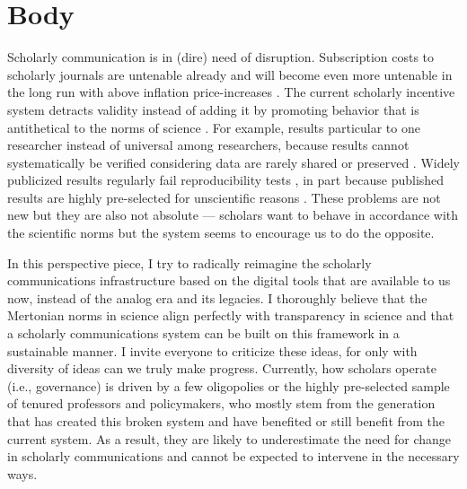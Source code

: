 \documentclass[]{tufte-book}
\begin{document}
\section{Body}\label{body}

Scholarly communication is in (dire) need of disruption. Subscription
costs to scholarly journals are untenable already
\citep[e.g.,][]{harvard-serials-crisis} and will become even more
untenable in the long run with above inflation price-increases
\citep[i.e., serials crisis;][]{serials-crisis}. The current scholarly
incentive system detracts validity instead of adding it
\citep[e.g.,][]{10.1371/journal.pmed.0020124, 10.1371/journal.pmed.0050201}
by promoting behavior that is antithetical to the norms of science
\citep{merton1942, 10.2307/2094423, 10.1525/jer.2007.2.4.3}. For
example, results particular to one researcher instead of universal among
researchers, because results cannot systematically be verified
considering data are rarely shared
\citep{10.1038/nature.2017.21549, 10.1525/collabra.13, 10.1037/0003-066x.61.7.726}
or preserved \citep{10.1016/j.cub.2013.11.014}. Widely publicized
results regularly fail reproducibility tests
\citetext{\citealp[e.g.,][]{10.1126/science.aac4716}; \citealp{10.1038/483531a}; \citealp{10.1038/541269a}; \citealp[but
see also][]{10.1016/j.jesp.2015.10.001}}, in part because published
results are highly pre-selected for unscientific reasons
\citetext{\citealp[e.g., pure novelty of
results,][]{10.1016/j.tree.2013.05.007}; \citealp[easy to assimilate
findings,][]{10.1038/526182a}; \citealp[statistical
significance,][]{10.1126/science.1255484}; \citealp{10.1016/0140-67369190201-Y}}.
These problems are not new but they are also not absolute --- scholars
want to behave in accordance with the scientific norms
\citep{10.1525/jer.2007.2.4.3} but the system seems to encourage us to
do the opposite.

In this perspective piece, I try to radically reimagine the scholarly
communications infrastructure based on the digital tools that are
available to us now, instead of the analog era and its legacies. I
thoroughly believe that the Mertonian norms in science
\citep{merton1942} align perfectly with transparency in science
\citep[see also][]{10.14293/s2199-1006.1.sor-socsci.arysbi.v1} and that
a scholarly communications system can be built on this framework in a
sustainable manner. I invite everyone to criticize these ideas, for only
with diversity of ideas can we truly make progress. Currently, how
scholars operate (i.e., governance) is driven by a few oligopolies
\citep{10.1371/journal.pone.0127502} or the highly pre-selected sample
of tenured professors and policymakers, who mostly stem from the
generation that has created this broken system and have benefited or
still benefit from the current system. As a result, they are likely to
underestimate the need for change in scholarly communications and cannot
be expected to intervene in the necessary ways.
\end{document}
